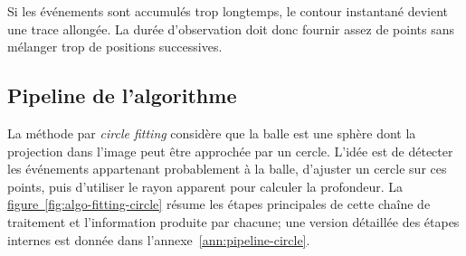 \documentclass[a4paper,11pt]{report}
\newcommand{\figref}[1]{\hyperref[#1]{figure~\ref*{#1}}}
\begin{document}
Si les événements sont accumulés trop longtemps, le contour instantané devient
une trace allongée. La durée d'observation doit donc fournir assez de points
sans mélanger trop de positions successives.

\subsection{Pipeline de l'algorithme}

La méthode par \emph{circle fitting} considère que la balle est une sphère dont la projection dans l'image peut être approchée par un cercle. L'idée est de détecter les événements appartenant probablement à la balle, d'ajuster un cercle sur ces points, puis d'utiliser le rayon apparent pour calculer la profondeur. La \figref{fig:algo-fitting-circle} résume les étapes principales de cette chaîne de traitement et l'information produite par chacune; une version détaillée des étapes internes est donnée dans l'annexe~\ref{ann:pipeline-circle}.
\end{document}
